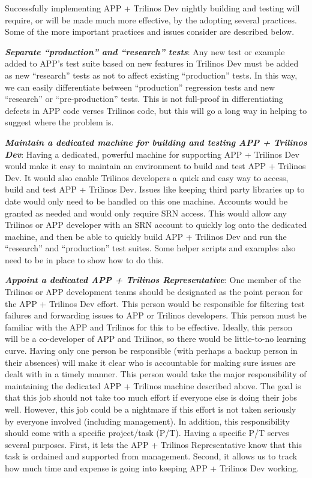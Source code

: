 \documentclass[pdf,ps2pdf,11pt]{SANDreport}
\begin{document}
Successfully implementing APP + Trilinos Dev nightly building and testing will
require, or will be made much more effective, by the adopting several
practices.  Some of the more important practices and issues consider are
described below.

{}\textit{\textbf{Separate ``production'' and ``research'' tests}}: Any new
test or example added to APP's test suite based on new features in Trilinos
Dev must be added as new ``research'' tests as not to affect existing
``production'' tests.  In this way, we can easily differentiate between
``production'' regression tests and new ``research'' or ``pre-production''
tests.  This is not full-proof in differentiating defects in APP code verses
Trilinos code, but this will go a long way in helping to suggest where the
problem is.

{}\textit{\textbf{Maintain a dedicated machine for building and testing APP +
Trilinos Dev}}: Having a dedicated, powerful machine for supporting APP +
Trilinos Dev would make it easy to maintain an environment to build and test
APP + Trilinos Dev.  It would also enable Trilinos developers a quick and easy
way to access, build and test APP + Trilinos Dev.  Issues like keeping third
party libraries up to date would only need to be handled on this one machine.
Accounts would be granted as needed and would only require SRN access.  This
would allow any Trilinos or APP developer with an SRN account to quickly log
onto the dedicated machine, and then be able to quickly build APP + Trilinos
Dev and run the ``research'' and ``production'' test suites.  Some helper
scripts and examples also need to be in place to show how to do this.

{}\textit{\textbf{Appoint a dedicated APP + Trilinos Representative}}: One
member of the Trilinos or APP development teams should be designated as the
point person for the APP + Trilinos Dev effort.  This person would be
responsible for filtering test failures and forwarding issues to APP or
Trilinos developers.  This person must be familiar with the APP and Trilinos
for this to be effective.  Ideally, this person will be a co-developer of APP
and Trilinos, so there would be little-to-no learning curve.  Having only one
person be responsible (with perhaps a backup person in their absences) will
make it clear who is accountable for making sure issues are dealt with in a
timely manner.  This person would take the major responsibility of maintaining
the dedicated APP + Trilinos machine described above. The goal is that this
job should not take too much effort if everyone else is doing their jobs well.
However, this job could be a nightmare if this effort is not taken seriously
by everyone involved (including management).  In addition, this responsibility
should come with a specific project/task (P/T).  Having a specific P/T serves
several purposes.  First, it lets the APP + Trilinos Representative know that
this task is ordained and supported from management.  Second, it allows us to
track how much time and expense is going into keeping APP + Trilinos Dev
working.
\end{document}
